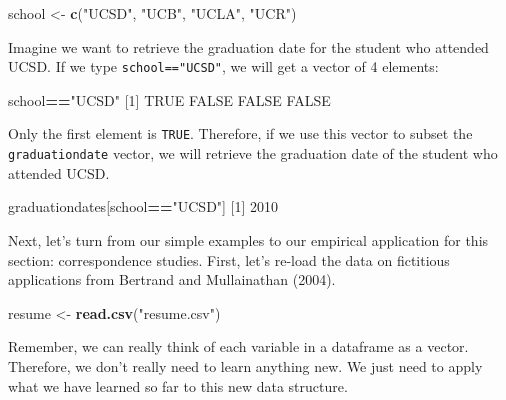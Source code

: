 \documentclass[
]{book}
\newenvironment{Shaded}{\begin{snugshade}}{\end{snugshade}}
\newcommand{\ConstantTok}[1]{\textcolor[rgb]{0.56,0.35,0.01}{#1}}
\newcommand{\DecValTok}[1]{\textcolor[rgb]{0.00,0.00,0.81}{#1}}
\newcommand{\FunctionTok}[1]{\textcolor[rgb]{0.13,0.29,0.53}{\textbf{#1}}}
\newcommand{\NormalTok}[1]{#1}
\newcommand{\OtherTok}[1]{\textcolor[rgb]{0.56,0.35,0.01}{#1}}
\newcommand{\SpecialCharTok}[1]{\textcolor[rgb]{0.81,0.36,0.00}{\textbf{#1}}}
\newcommand{\StringTok}[1]{\textcolor[rgb]{0.31,0.60,0.02}{#1}}
\begin{document}
\begin{Shaded}
\begin{Highlighting}[]
\NormalTok{school }\OtherTok{\textless{}{-}} \FunctionTok{c}\NormalTok{(}\StringTok{"UCSD"}\NormalTok{, }\StringTok{"UCB"}\NormalTok{, }\StringTok{"UCLA"}\NormalTok{, }\StringTok{"UCR"}\NormalTok{)}
\end{Highlighting}
\end{Shaded}

Imagine we want to retrieve the graduation date for the student who attended UCSD. If we type \texttt{school=="UCSD"}, we will get a vector of 4 elements:

\begin{Shaded}
\begin{Highlighting}[]
\NormalTok{school}\SpecialCharTok{==}\StringTok{"UCSD"}
\NormalTok{[}\DecValTok{1}\NormalTok{]  }\ConstantTok{TRUE} \ConstantTok{FALSE} \ConstantTok{FALSE} \ConstantTok{FALSE}
\end{Highlighting}
\end{Shaded}

Only the first element is \texttt{TRUE}. Therefore, if we use this vector to subset the \texttt{graduationdate} vector, we will retrieve the graduation date of the student who attended UCSD.

\begin{Shaded}
\begin{Highlighting}[]
\NormalTok{graduationdates[school}\SpecialCharTok{==}\StringTok{"UCSD"}\NormalTok{]}
\NormalTok{[}\DecValTok{1}\NormalTok{] }\DecValTok{2010}
\end{Highlighting}
\end{Shaded}

Next, let's turn from our simple examples to our empirical application for this section: correspondence studies. First, let's re-load the data on fictitious applications from Bertrand and Mullainathan (2004).

\begin{Shaded}
\begin{Highlighting}[]
\NormalTok{resume }\OtherTok{\textless{}{-}} \FunctionTok{read.csv}\NormalTok{(}\StringTok{"resume.csv"}\NormalTok{)}
\end{Highlighting}
\end{Shaded}

Remember, we can really think of each variable in a dataframe as a vector. Therefore, we don't really need to learn anything new. We just need to apply what we have learned so far to this new data structure.
\end{document}
